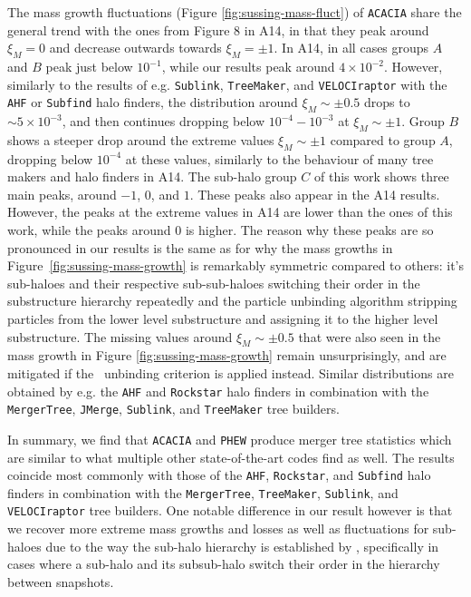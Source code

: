 The mass growth fluctuations (Figure \ref{fig:sussing-mass-fluct}) of \texttt{ACACIA} share the 
general trend with the ones from Figure 8 in A14, in that they peak around $\xi_M = 0$ and decrease 
outwards towards $\xi_M = \pm 1$. In A14, in all cases groups $A$ and $B$ peak just below 
$10^{-1}$, while our results peak around $4 \times 10^{-2}$. However, similarly to the results of 
e.g. \texttt{Sublink}, \texttt{TreeMaker}, and \texttt{VELOCIraptor} with the \texttt{AHF} or 
\texttt{Subfind} halo finders, the distribution around $\xi_M \sim \pm 0.5$ drops to $\sim 5 \times 
10^{-3}$, and then continues dropping below $10^{-4} - 10^{-3}$ at $\xi_M \sim \pm 1$. 
Group $B$ shows a steeper drop around the extreme values $\xi_M \sim \pm 1$ compared to group $A$, 
dropping below $10^{-4}$ at these values, similarly to the behaviour of many tree makers and halo 
finders in A14.
The sub-halo group $C$ of this work shows three main peaks, around $-1$, $0$, and $1$.
These peaks also appear in the A14 results.
However, the peaks at the extreme values in A14 are lower than the ones of this work, while the 
peaks around $0$ is higher. The reason why these peaks are so pronounced in our results is the same 
as for why the mass growths in Figure~\ref{fig:sussing-mass-growth} is remarkably symmetric 
compared to others: it's sub-haloes and their respective sub-sub-haloes switching their order in the 
substructure hierarchy repeatedly and the particle unbinding algorithm stripping particles from the 
lower level substructure and assigning it to the higher level substructure.
The missing values around $\xi_M \sim \pm 0.5$ that were also seen in the mass growth in Figure 
\ref{fig:sussing-mass-growth} remain unsurprisingly, and are mitigated if the \nosad\ unbinding 
criterion is applied instead.
Similar distributions are obtained by e.g. the \texttt{AHF} and \texttt{Rockstar} halo finders in 
combination with the \texttt{MergerTree}, \texttt{JMerge}, \texttt{Sublink}, and \texttt{TreeMaker} 
tree builders.

In summary, we find that \texttt{ACACIA} and \texttt{PHEW} produce merger tree statistics which are 
similar to what multiple other state-of-the-art codes find as well. The results coincide most 
commonly with those of the \texttt{AHF}, \texttt{Rockstar}, and \texttt{Subfind} halo finders in 
combination with the \texttt{MergerTree}, \texttt{TreeMaker}, \texttt{Sublink}, and 
\texttt{VELOCIraptor} tree builders. One notable difference in our result however is that we 
recover more extreme mass growths and losses as well as fluctuations for sub-haloes due to the way 
the sub-halo hierarchy is established by \phew, specifically in cases where a sub-halo and its 
subsub-halo switch their order in the hierarchy between snapshots.